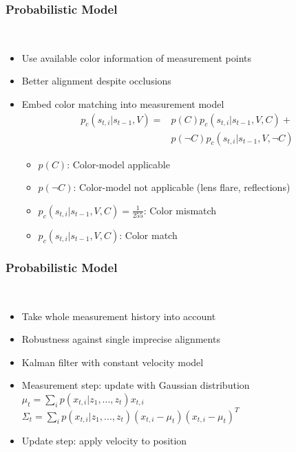 \begin{frame}
  \frametitle{Probabilistic Model}
  \begin{description}[]
  \item[Adding Color] \hfill \\
  \begin{itemize}
  \item Use available color information of measurement points
  \item Better alignment despite occlusions
  \item Embed color matching into measurement model
  \begin{align}
p_c(s_{t,i}|s_{t-1},V)
  = &p(C)p_c(s_{t,i}|s_{t-1},V,C)+ \nonumber\\
&p(\neg C)p_c(s_{t,i}|s_{t-1},V,\neg C)\nonumber
  \end{align}
  \begin{itemize}
  \item $p(C)$: Color-model applicable
  \item $p(\neg C)$: Color-model not applicable (lens flare, reflections)
  \item $p_c(s_{t,i}|s_{t-1},V,C)=\frac{1}{255}$: Color mismatch
  \item $p_c(s_{t,i}|s_{t-1},V,C)$: Color match
  \end{itemize}
  \end{itemize}
  \end{description}
\end{frame}

\begin{frame}
  \frametitle{Probabilistic Model}
  \begin{description}[]
  \item[Motion Model] \hfill \\
  \begin{itemize}
  \item Take whole measurement history into account
  \item Robustness against single imprecise alignments
  \pause
  \item Kalman filter with constant velocity model
  \item Measurement step: update with Gaussian distribution\\
        $\mu_t=\sum_i p(x_{t,i}|z_1,...,z_t)x_{t,i}$\\
        $\Sigma_t=\sum_i p(x_{t,i}|z_1,...,z_t) (x_{t,i}-\mu_t)(x_{t,i}-\mu_t)^T$
  \item Update step: apply velocity to position
  \end{itemize}
  \end{description}
\end{frame}



